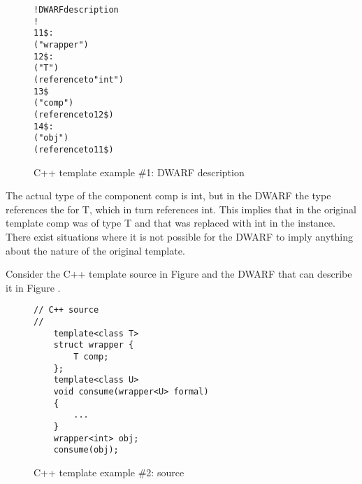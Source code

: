 \begin{figure}[h]
\begin{dwflisting}
\begin{alltt}
! DWARF description
!
11\$: 
        ("wrapper")
12\$: 
        ("T")
        (reference to "int")
13\$ 
        ("comp")
        (reference to 12\$)
14\$: 
        ("obj")
        (reference to 11\$)
\end{alltt}
\end{dwflisting}
\caption{C++ template example \#1: DWARF description}
\label{fig:ctemplateexample1dwarf}
\end{figure}

The actual type of the component comp is int, but in the DWARF
the type references the
for T, which in turn references int. This implies that in the
original template comp was of type T and that was replaced
with int in the instance. There exist situations where it is
not possible for the DWARF to imply anything about the nature
of the original template. 

Consider the C++ template source in
Figure 
and the DWARF that can describe it in
Figure .

\begin{figure}[!h]
\begin{lstlisting}
// C++ source
//
    template<class T>
    struct wrapper {
        T comp;
    };
    template<class U>
    void consume(wrapper<U> formal)
    {
        ...
    }
    wrapper<int> obj;
    consume(obj);
\end{lstlisting}
\caption{C++ template example \#2: source}
\label{fig:ctemplateexample2source}
\end{figure}

